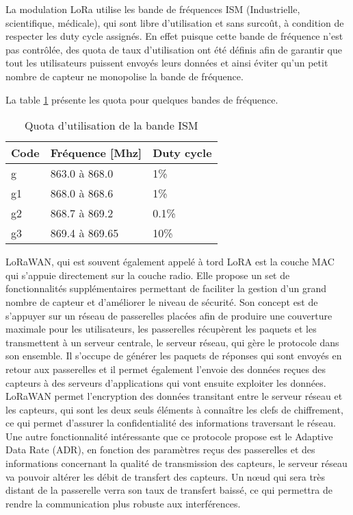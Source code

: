 La modulation LoRa utilise les bande de fréquences ISM (Industrielle, scientifique, médicale), qui sont libre d'utilisation et sans surcoût, à condition de respecter les duty cycle assignés. En effet puisque cette bande de fréquence n'est pas contrôlée, des quota de taux d'utilisation ont été définis afin de garantir que tout les utilisateurs puissent envoyés leurs données et ainsi éviter qu'un petit nombre de capteur ne monopolise la bande de fréquence. \cite{ism_bands}

La table \ref{tab:bande_ism} présente les quota pour quelques bandes de fréquence.

\begin{table}[htb]
\caption{Quota d'utilisation de la bande ISM}
\label{tab:bande_ism}
\centering
\begin{tabular}{ l l l }
\toprule
Code & Fréquence [Mhz] & Duty cycle \\
\midrule
g & 863.0 à 868.0 & 1\% \\
g1 & 868.0 à 868.6 & 1\% \\
g2 & 868.7 à 869.2 & 0.1\% \\
g3 & 869.4 à 869.65 & 10\% \\
\bottomrule 
\end{tabular}
\end{table}

LoRaWAN, qui est souvent également appelé à tord LoRA est la couche MAC qui s'appuie directement sur la couche radio. Elle propose un set de fonctionnalités supplémentaires permettant de faciliter la gestion d'un grand nombre de capteur et d'améliorer le niveau de sécurité. Son concept est de s'appuyer sur un réseau de passerelles placées afin de produire une couverture maximale pour les utilisateurs, les passerelles récupèrent les paquets et les transmettent à un serveur centrale, le serveur réseau, qui gère le protocole dans son ensemble. Il s'occupe de générer les paquets de réponses qui sont envoyés en retour aux passerelles et il permet également l'envoie des données reçues des capteurs à des serveurs d'applications qui vont ensuite exploiter les données. LoRaWAN permet l'encryption des données transitant entre le serveur réseau et les capteurs, qui sont les deux seuls éléments à connaître les clefs de chiffrement, ce qui permet d'assurer la confidentialité des informations traversant le réseau. Une autre fonctionnalité intéressante que ce protocole propose est le Adaptive Data Rate (ADR), en fonction des paramètres reçus des passerelles et des informations concernant la qualité de transmission des capteurs, le serveur réseau va pouvoir altérer les débit de transfert des capteurs. Un nœud qui sera très distant de la passerelle verra son taux de transfert baissé, ce qui permettra de rendre la communication plus robuste aux interférences. \cite{lorawan_spec}

